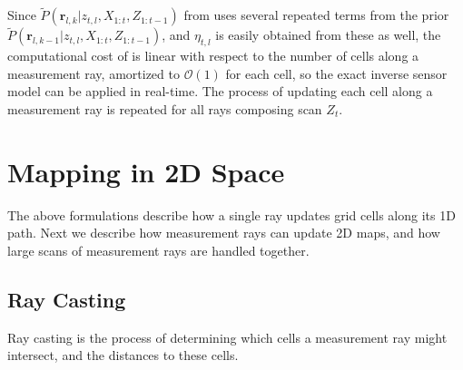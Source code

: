 
Since $\tilde P(\mathbf{r}_{l,k}|z_{t,l},X_{1:t},Z_{1:t-1})$ from  uses several repeated terms from the prior $\tilde P(\mathbf{r}_{l,k-1}|z_{t,l},X_{1:t},Z_{1:t-1})$, and $\eta_{t,l}$ is easily obtained from these as well, the computational cost of  is linear with respect to the number of cells along a measurement ray, amortized to $\mathcal{O}(1)$ for each cell, so the exact inverse sensor model can be applied in real-time. The process of updating each cell along a measurement ray is repeated for all rays composing scan $Z_t$.



\section{Mapping in 2D Space}

The above formulations describe how a single ray updates grid cells along its 1D path. Next we describe how measurement rays can update 2D maps, and how large scans of measurement rays are handled together.

\subsection{Ray Casting}

Ray casting is the process of determining which cells a measurement ray might intersect, and the distances to these cells.

